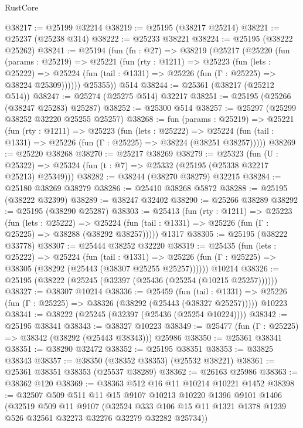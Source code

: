 \begin{lexlean}{RustCore}
\begin{coremodule}
@38217 := @25199 @32214
@38219 := @25195 (@38217 @25214)
@38221 := @25237 (@25238 @314)
@38222 := @25233 @38221
@38224 := @25195 (@38222 @25262)
@38241 := @25194
    (fun (fn : @27) =>
    @38219
      (@25217
        (@25220
          (fun (params : @25219) =>
          @25221
            (fun (rty : @1211) =>
            @25223
              (fun (lets : @25222) =>
              @25224 (fun (tail : @1331) => @25226 (fun (Γ : @25225) => @38224 @25309))))))
        @25355))
    @514
@38244 := @25361 (@38217 (@25212 @514))
@38247 := @25274 (@25275 @514) @32217
@38251 := @25195 (@25266 (@38247 @25283) @25287)
@38252 := @25300 @514
@38257 := @25297 (@25299 @38252 @32220 @25255 @25257)
@38268 := fun (params : @25219) =>
  @25221
    (fun (rty : @1211) =>
    @25223
      (fun (lets : @25222) =>
      @25224 (fun (tail : @1331) => @25226 (fun (Γ : @25225) => @38224 (@38251 @38257)))))
@38269 := @25220 @38268
@38270 := @25217 @38269
@38279 := @25323
    (fun (U : @25322) => @25324 (fun (t : @7) => @25332 (@25195 (@25338 @32217 @25213) @25349)))
@38282 := @38244 (@38270 @38279) @32215
@38284 := @25180 @38269 @38279
@38286 := @25410 @38268 @5872
@38288 := @25195 (@38222 @32399)
@38289 := @38247 @32402
@38290 := @25266 @38289
@38292 := @25195 (@38290 @25287)
@38303 := @25413
    (fun (rty : @1211) =>
    @25223
      (fun (lets : @25222) =>
      @25224 (fun (tail : @1331) => @25226 (fun (Γ : @25225) => @38288 (@38292 @38257)))))
    @1317
@38305 := @25195 (@38222 @33778)
@38307 := @25444 @38252 @32220
@38319 := @25435
    (fun (lets : @25222) =>
    @25224
      (fun (tail : @1331) =>
      @25226 (fun (Γ : @25225) => @38305 (@38292 (@25443 (@38307 @25255 @25257))))))
    @10214
@38326 := @25195 (@38222 (@25245 (@32397 (@25436 (@25254 (@10215 @25257))))))
@38327 := @38307 @10214
@38336 := @25459
    (fun (tail : @1331) => @25226 (fun (Γ : @25225) => @38326 (@38292 (@25443 (@38327 @25257)))))
    @10223
@38341 := @38222 (@25245 (@32397 (@25436 (@25254 @10224))))
@38342 := @25195 @38341
@38343 := @38327 @10223
@38349 := @25477 (fun (Γ : @25225) => @38342 (@38292 (@25443 @38343))) @25986
@38350 := @25361 @38341
@38351 := @38290 @32472
@38352 := @25195 @38351
@38353 := @33825 @38343
@38357 := @38350 (@38352 @38353) (@25532 @38221)
@38361 := @25361 @38351 @38353 (@25537 @38289)
@38362 := @26163 @25986
@38363 := @38362 @120
@38369 := @38363 @512 @16 @11 @10214 @10221 @1452
@38398 := @32507
    @509
    @511
    @11
    @15
    @9107
    @10213
    @10220
    @1396
    @9101
    @1406
    (@32519
      @509
      @11
      @9107
      (@32524 @333 @106 @15 @11 @1321 @1378 @1239 @526 @32561 @32273 @32276 @32279 @32282 @25734))

\end{coremodule}
\end{lexlean}
